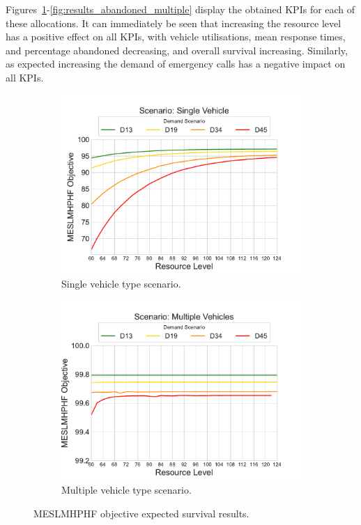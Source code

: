 \documentclass[preprint,12pt]{elsarticle}
\begin{document}
Figures~\ref{fig:results_objective_single}-\ref{fig:results_abandoned_multiple}
display the obtained KPIs for each of these allocations. It can immediately be
seen that increasing the resource level has a positive effect on all KPIs,
with vehicle utilisations, mean response times, and percentage abandoned
decreasing, and overall survival increasing. Similarly, as expected increasing
the demand of emergency calls has a negative impact on all KPIs.

\begin{figure}
\begin{center}
\begin{subfigure}{0.42\textwidth}
\includegraphics[width=\textwidth]{img/plots/single_Objective}
\caption{Single vehicle type scenario.}
\label{fig:results_objective_single}
\end{subfigure}
\begin{subfigure}{0.42\textwidth}
\includegraphics[width=\textwidth]{img/plots/multiple_Objective}
\caption{Multiple vehicle type scenario.}
\label{fig:results_objective_multiple}
\end{subfigure}
\end{center}
\caption{MESLMHPHF objective expected survival results.}
\label{fig:results_objective}
\end{figure}
\end{document}
